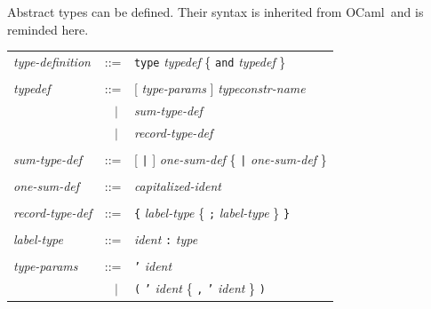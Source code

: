 \documentclass[11pt,titlepage,twoside]{report}
\newcommand{\ocaml}{{\sf OCaml}}
\newcommand{\alt}{\;|\;}
\newcommand{\term}[1]{{\tt #1}}
\newcommand{\nterm}[1]{{\em #1}}
\begin{document}
Abstract types can be defined. Their syntax is inherited from \ocaml\
and is reminded here. 
\begin{center}
\begin{tabular}{lcl}
\nterm{type-definition} 
  & ::=    & \term{type} \nterm{typedef} 
             \{ \term{and} \nterm{typedef} \} 
\\ \\
\nterm{typedef}
  & ::=        & [ \nterm{type-params} ] \nterm{typeconstr-name} \\
  & $\;\;\alt$ & \nterm{sum-type-def} \\
  & $\;\;\alt$ & \nterm{record-type-def} 
\\ \\
\nterm{sum-type-def}
  & ::=        & [ \term{|} ] \nterm{one-sum-def} 
                 \{ \term{|} \nterm{one-sum-def} \} 
\\ \\
\nterm{one-sum-def}     
& ::=        & \nterm{capitalized-ident}
\\ \\
\nterm{record-type-def} 
  & ::=        & \term{\{} \nterm{label-type}
                 \{ \term{;} \nterm{label-type} \} \term{\}} 
\\ \\
\nterm{label-type}
  & ::=        & \nterm{ident} \term{:} \nterm{type} 
\\ \\
\nterm{type-params}
  & ::=        & \term{'} \nterm{ident} \\
  & $\;\;\alt$ & \term{(} \term{'} \nterm{ident} 
                 \{ \term{,} \term{'} \nterm{ident} \} \term{)}
\end{tabular}
\end{center}

\end{document}
